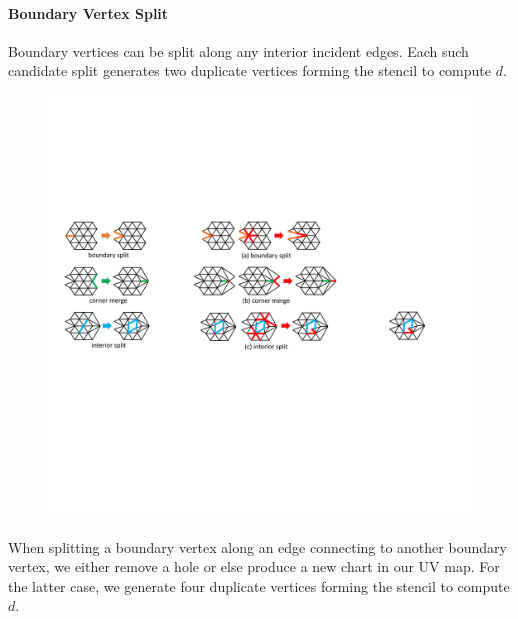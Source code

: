 \paragraph{Boundary Vertex Split}
Boundary vertices can be split along any interior incident edges. 
Each such candidate split generates two duplicate vertices forming the stencil to compute $d$.
\begin{figure}
  \begin{center}
  \vspace{-4mm}
    \includegraphics[width=1\linewidth]{fig/bSplit}
  \end{center}
\end{figure}
When splitting a boundary vertex along an edge connecting to another boundary vertex, we either remove a hole or else produce a new chart in our UV map. For the latter case, we generate four duplicate vertices forming the stencil to compute $d$.

